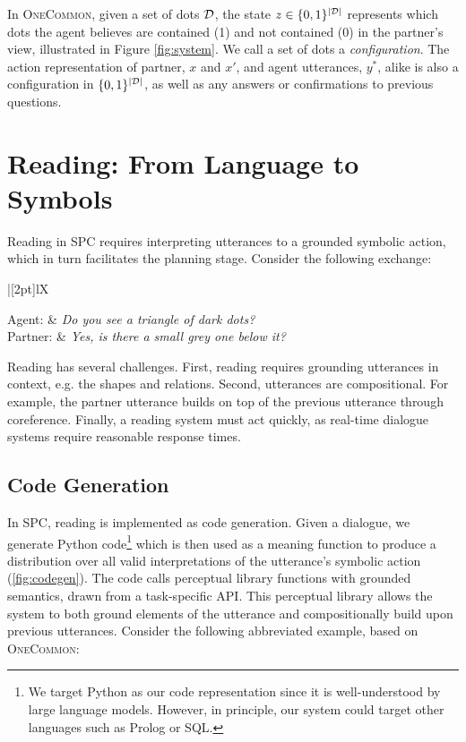 \documentclass[11pt]{article}
\newcommand{\system}{SPC}
\newenvironment{Dialogue}[1][\small]{
    #1
    \def\arraystretch{1.3}
    \setlength\tabcolsep{7pt}
    \taburulecolor{lightgray}
    \vspace{.8em}
    \noindent
    \begin{tabu} to \columnwidth {|[2pt]lX}
}{
    \end{tabu}
    \vspace{.5em}
}
\newcommand{\Partner}[1]{Partner: & \UserUtt{#1} \\}
\newcommand{\AgentSay}[1]{Agent: & \AgentUtt{#1} \\}
\newcommand{\UserUtt}[1]{\textit{#1}}
\newcommand{\AgentUtt}[1]{\textit{#1}}
\begin{document}
In \textsc{OneCommon}, given a set of dots $\mathcal{D}$, the state $z \in \{0, 1\}^{|\mathcal{D}|}$ represents which dots the agent believes are contained (1) and not contained (0) in the partner's view, illustrated in Figure \ref{fig:system}. We call a set of dots a \textit{configuration}.
The action representation of partner, $x$ and $x'$, and agent utterances, $y^*$, alike is also a configuration in $\{0,1\}^{|\mathcal{D}|}$, as well as any answers or confirmations to previous questions.

\section{Reading: From Language to Symbols}
\label{sec:reading}
Reading in \system{} requires interpreting utterances to a grounded symbolic action, which in turn facilitates the planning stage. Consider the following exchange:
\vspace{-0.5em}

\begin{Dialogue}
    \AgentSay{Do you see a triangle of dark dots?}
    \Partner{Yes, is there a small grey one below it?}
\end{Dialogue}%
\vspace{-1em}

Reading has several challenges. First, reading requires grounding utterances in context, e.g. the shapes and relations. Second, utterances are compositional. For example, the partner utterance builds on top of the previous utterance through coreference.
Finally, a reading system must act quickly, as real-time dialogue systems require reasonable response times.

\subsection{Code Generation}
\label{sec:code-generation}

In \system{}, reading is implemented as code generation. Given a dialogue, we generate Python code\footnote{We target Python as our code representation since it is well-understood by large language models. However, in principle, our system could target other languages such as Prolog or SQL.} which is then used as a meaning function to produce a distribution over all valid interpretations of the utterance's symbolic action (\autoref{fig:codegen}).
The code calls perceptual library functions with grounded semantics, drawn from a task-specific API.
This perceptual library allows the system to both ground elements of the utterance and compositionally build upon previous utterances. Consider the following abbreviated example, based on \textsc{OneCommon}:
\end{document}
